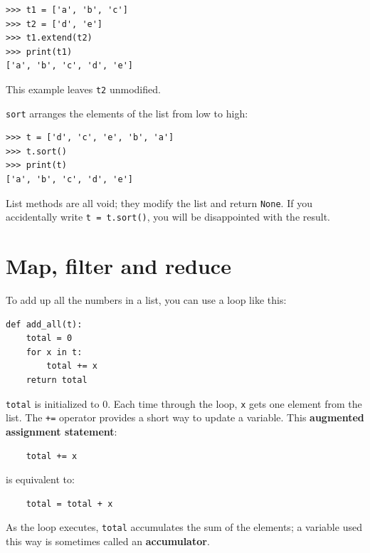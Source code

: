 \documentclass[10pt]{book}
\begin{document}

\beforeverb
\begin{verbatim}
>>> t1 = ['a', 'b', 'c']
>>> t2 = ['d', 'e']
>>> t1.extend(t2)
>>> print(t1)
['a', 'b', 'c', 'd', 'e']
\end{verbatim}
\afterverb
%
This example leaves {\tt t2} unmodified.

{\tt sort} arranges the elements of the list from low to high:


\beforeverb
\begin{verbatim}
>>> t = ['d', 'c', 'e', 'b', 'a']
>>> t.sort()
>>> print(t)
['a', 'b', 'c', 'd', 'e']
\end{verbatim}
\afterverb
%
List methods are all void; they modify the list and return {\tt None}.
If you accidentally write {\tt t = t.sort()}, you will be disappointed
with the result.



\section{Map, filter and reduce}

To add up all the numbers in a list, you can use a loop like this:


\beforeverb
\begin{verbatim}
def add_all(t):
    total = 0
    for x in t:
        total += x
    return total
\end{verbatim}
\afterverb
%
{\tt total} is initialized to 0.  Each time through the loop,
{\tt x} gets one element from the list.  The {\tt +=} operator
provides a short way to update a variable.  This 
{\bf augmented assignment statement}:



\beforeverb
\begin{verbatim}
    total += x
\end{verbatim}
\afterverb
%
is equivalent to:

\beforeverb
\begin{verbatim}
    total = total + x
\end{verbatim}
\afterverb
%
As the loop executes, {\tt total} accumulates the sum of the
elements; a variable used this way is sometimes called an
{\bf accumulator}.
\end{document}
